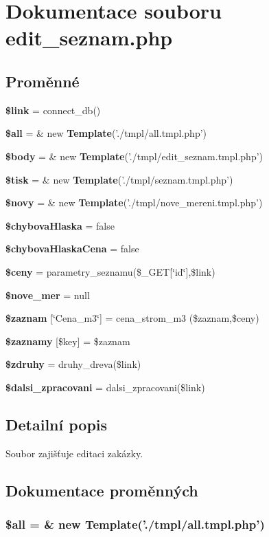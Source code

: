 \section{Dokumentace souboru edit\_\-seznam.php}
\label{edit__seznam_8php}
\subsection*{Proměnné}
\begin{CompactItemize}
\item 
{\bf \$link} = connect\_\-db()
\item 
{\bf \$all} = \& new {\bf Template}('./tmpl/all.tmpl.php')
\item 
{\bf \$body} = \& new {\bf Template}('./tmpl/edit\_\-seznam.tmpl.php')
\item 
{\bf \$tisk} = \& new {\bf Template}('./tmpl/seznam.tmpl.php')
\item 
{\bf \$novy} = \& new {\bf Template}('./tmpl/nove\_\-mereni.tmpl.php')
\item 
{\bf \$chybovaHlaska} = false
\item 
{\bf \$chybovaHlaskaCena} = false
\item 
{\bf \$ceny} = parametry\_\-seznamu(\$\_\-GET[\char`\"{}id\char`\"{}],\$link)
\item 
{\bf \$nove\_\-mer} = null
\item 
{\bf \$zaznam} [\char`\"{}Cena\_\-m3\char`\"{}] = cena\_\-strom\_\-m3 (\$zaznam,\$ceny)
\item 
{\bf \$zaznamy} [\$key] = \$zaznam
\item 
{\bf \$zdruhy} = druhy\_\-dreva(\$link)
\item 
{\bf \$dalsi\_\-zpracovani} = dalsi\_\-zpracovani(\$link)
\end{CompactItemize}


\subsection{Detailní popis}
Soubor zajišťuje editaci zakázky. 

\subsection{Dokumentace proměnných}
\subsubsection{\setlength{\rightskip}{0pt plus 5cm}\$all = \& new {\bf Template}('./tmpl/all.tmpl.php')}\label{edit__seznam_8php_3c74ea9d2348c9aba28d36e692bef2d2}


